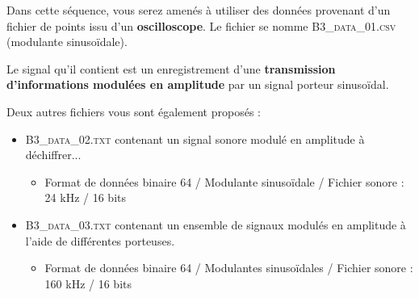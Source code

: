 

Dans cette séquence, vous serez amenés à utiliser des données provenant d'un fichier de points issu d'un \textbf{oscilloscope}. Le fichier se nomme \mbox{\textsc{B3\_data\_01.csv}} (modulante sinusoïdale).

Le signal qu'il contient est un enregistrement d'une \textbf{transmission d'informations modulées en amplitude} par un signal porteur sinusoïdal.

\medskip

Deux autres fichiers vous sont également proposés :
\begin{itemize}
	\item  \mbox{\textsc{B3\_data\_02.txt}} contenant un signal sonore modulé en amplitude à déchiffrer...
	\begin{itemize}
		\item Format de données binaire 64 / Modulante sinusoïdale / Fichier sonore : 24 kHz / 16 bits
	\end{itemize}
	\item  \mbox{\textsc{B3\_data\_03.txt}} contenant un ensemble de signaux modulés en amplitude à l'aide de différentes porteuses.
	\begin{itemize}
		\item Format de données binaire 64 / Modulantes sinusoïdales / Fichier sonore : 160 kHz / 16 bits
	\end{itemize}
\end{itemize}



